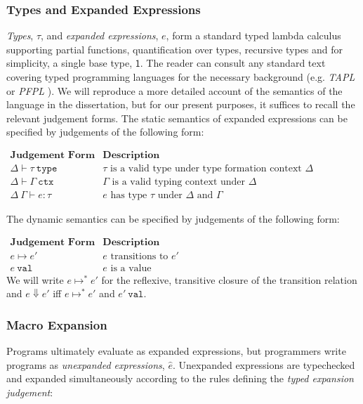 \subsubsection{Types and Expanded Expressions}
\emph{Types}, $\tau$, and \emph{expanded expressions}, $e$, form a standard typed lambda calculus supporting partial functions, quantification over types, recursive types and for simplicity, a single base type, $\mathsf{1}$. The reader can consult any standard text covering typed programming languages for the necessary background (e.g. \emph{TAPL} \cite{tapl} or \emph{PFPL} \cite{pfpl}). We will reproduce a more detailed account of the semantics of the language in the dissertation, but for our present purposes, it suffices to recall the relevant judgement forms. The static  semantics of expanded expressions can be specified by judgements of the following form:

$\begin{array}{ll}
\textbf{Judgement Form} & \textbf{Description}\\
\Delta \vdash \tau~\mathtt{type} & \text{$\tau$ is a valid type under type formation context $\Delta$}\\
\Delta \vdash \Gamma~\mathtt{ctx} & \text{$\Gamma$ is a valid typing context under $\Delta$}\\
\Delta~\Gamma \vdash e : \tau & \text{$e$ has type $\tau$ under $\Delta$ and $\Gamma$}
\end{array}$

\noindent
The dynamic semantics can be specified by judgements of the following form:

$\begin{array}{ll}
\textbf{Judgement Form} & \textbf{Description}\\
e \mapsto e' & \text{$e$ transitions to $e'$}\\
e~\mathtt{val} & \text{$e$ is a value}
\end{array}$
\\\noindent
We will write $e \mapsto^* e'$ for the reflexive, transitive closure of the transition relation and $e \Downarrow e'$ iff $e \mapsto^* e'$ and $e'~\mathtt{val}$.

\subsubsection{Macro Expansion}
Programs ultimately evaluate as expanded expressions, but programmers write programs as \emph{unexpanded expressions}, $\hat{e}$. Unexpanded expressions are typechecked and expanded simultaneously according to the rules defining the \emph{typed expansion judgement}:

